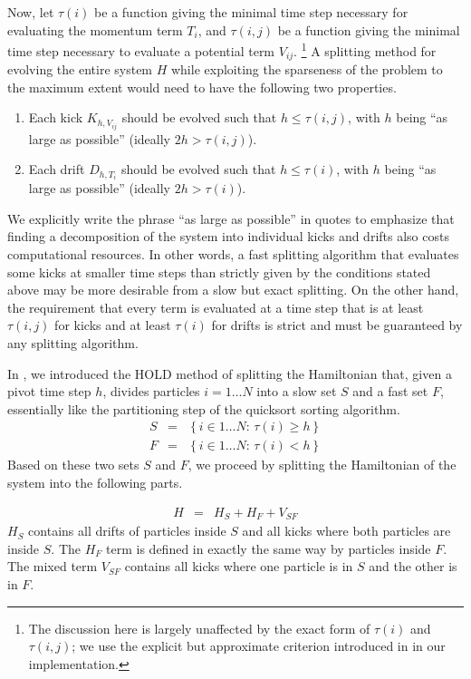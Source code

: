 \documentclass[referee]{aa}
\begin{document}
Now, let $\tau(i)$ be a function giving the minimal time step necessary
for evaluating the momentum term $T_{i}$, and $\tau(i,j)$ be a function
giving the minimal time step necessary to evaluate a potential term
$V_{ij}$.%
\footnote{The discussion here is largely unaffected by the exact form of $\tau(i)$
and $\tau(i,j)$; we use the explicit but approximate criterion introduced
in \cite{Pelupessy:2012if} in our implementation.%
} A splitting method for evolving the entire system $H$ while exploiting
the sparseness of the problem to the maximum extent would need to
have the following two properties.
\begin{enumerate}
\item Each kick $K_{h,V_{ij}}$ should be evolved such that $h\leq\tau(i,j)$,
with $h$ being ``as large as possible'' (ideally $2h>\tau(i,j)$).
\item Each drift $D_{h,T_{i}}$ should be evolved such that $h\leq\tau(i)$,
with $h$ being ``as large as possible'' (ideally $2h>\tau(i)$).
\end{enumerate}
We explicitly write the phrase ``as large as possible'' in quotes
to emphasize that finding a decomposition of the system into individual
kicks and drifts also costs computational resources. In other words,
a fast splitting algorithm that evaluates some kicks at smaller time
steps than strictly given by the conditions stated above may be more
desirable from a slow but exact splitting. On the other hand, the
requirement that every term is evaluated at a time step that is at
least $\tau(i,j)$ for kicks and at least $\tau(i)$ for drifts is
strict and must be guaranteed by any splitting algorithm.

In \cite{Pelupessy:2012if}, we introduced the HOLD method of splitting
the Hamiltonian that, given a pivot time step $h$, divides particles
$i=1\ldots N$ into a slow set $S$ and a fast set $F$, essentially
like the partitioning step of the quicksort sorting algorithm.
\begin{eqnarray*}
S & = & \left\{ i\in1\ldots N:\,\tau(i)\geq h\right\} \\
F & = & \left\{ i\in1\ldots N:\,\tau(i)<h\right\} 
\end{eqnarray*}
Based on these two sets $S$ and $F$, we proceed by splitting the
Hamiltonian of the system into the following parts.

\begin{eqnarray}
H & = & H_{S}+H_{F}+V_{SF}\label{eq:SF-splitting-rule}
\end{eqnarray}
$H_{S}$ contains all drifts of particles inside $S$ and all kicks
where both particles are inside $S$. The $H_{F}$ term is defined
in exactly the same way by particles inside $F$. The mixed term $V_{SF}$
contains all kicks where one particle is in $S$ and the other is
in $F$.
\end{document}
